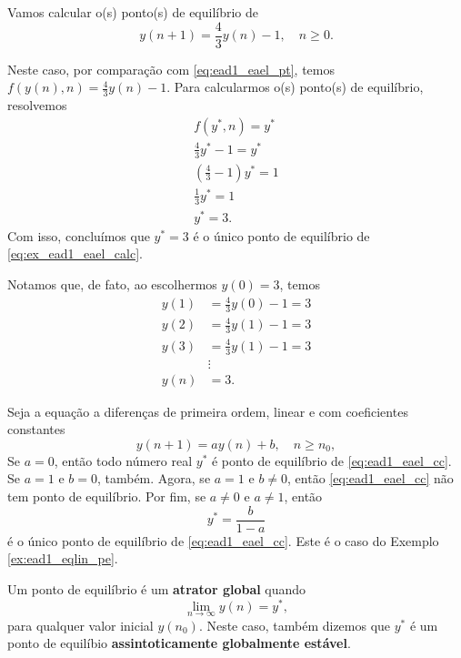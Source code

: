\begin{ex}\label{ex:ead1_eqlin_pe}
  Vamos calcular o(s) ponto(s) de equilíbrio de
  \begin{equation}\label{eq:ex_ead1_eael_calc}
    y(n+1) = \frac{4}{3}y(n)-1,\quad n\geq 0.
  \end{equation}

  Neste caso, por comparação com \eqref{eq:ead1_eael_pt}, temos $\displaystyle f(y(n),n) = \frac{4}{3}y(n)-1$. Para calcularmos o(s) ponto(s) de equilíbrio, resolvemos
  \begin{gather}
    f(y^*,n) = y^* \\
    \frac{4}{3}y^*-1 = y^* \\
    \left(\frac{4}{3}-1\right)y^* = 1 \\
    \frac{1}{3}y^* = 1 \\
    y^* = 3.
  \end{gather}
  Com isso, concluímos que $y^*=3$ é o único ponto de equilíbrio de \eqref{eq:ex_ead1_eael_calc}.

  Notamos que, de fato, ao escolhermos $y(0)=3$, temos
  \begin{align}
    y(1) &= \frac{4}{3}y(0) - 1 = 3 \\
    y(2) &= \frac{4}{3}y(1) - 1 = 3 \\
    y(3) &= \frac{4}{3}y(1) - 1 = 3 \\
         &\vdots \\
    y(n) &= 3.
  \end{align}
\end{ex}

Seja a equação a diferenças de primeira ordem, linear e com coeficientes constantes
\begin{equation}\label{eq:ead1_eael_cc}
  y(n+1) = ay(n) + b,\quad n\geq n_0,
\end{equation}
Se $a=0$, então todo número real $y^*$ é ponto de equilíbrio de \eqref{eq:ead1_eael_cc}. Se $a=1$ e $b=0$, também. Agora, se $a=1$ e $b\neq 0$, então \eqref{eq:ead1_eael_cc} não tem ponto de equilíbrio. Por fim, se $a\neq 0$ e $a\neq 1$, então
\begin{equation}
  y^* = \frac{b}{1-a}
\end{equation}
é o único ponto de equilíbrio de \eqref{eq:ead1_eael_cc}. Este é o caso do Exemplo \ref{ex:ead1_eqlin_pe}.

Um ponto de equilíbrio é um {\bf atrator global} quando
\begin{equation}
  \lim_{n\to\infty} y(n) = y^*,
\end{equation}
para qualquer valor inicial $y(n_0)$. Neste caso, também dizemos que $y^*$ é um ponto de equilíbio {\bf assintoticamente globalmente estável}.

